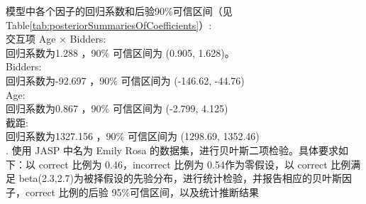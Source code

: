 \documentclass[stu,12pt,floatsintext]{apa7} %
\begin{document}

\begin{table}[H]
	\centering
	\caption{根据后验分布的系数估计}
	\label{tab:posteriorSummariesOfCoefficients}
\end{table}

模型中各个因子的回归系数和后验90\%可信区间（见Table\ref{tab:posteriorSummariesOfCoefficients}）:\\
交互项 Age × Bidders:\\
回归系数为1.288 ，90\% 可信区间为 (0.905, 1.628)。\\
Bidders:\\
回归系数为-92.697  ，90\% 可信区间为 (-146.62, -44.76)\\
Age:\\
回归系数为0.867  ，90\% 可信区间为 (-2.799, 4.125)\\
截距:\\
回归系数为1327.156 ，90\% 可信区间为 (1298.69, 1352.46)\\


\vspace{1em}
. {\heiti 使用 JASP 中名为 Emily Rosa 的数据集，进行贝叶斯二项检验。具体要求如下：以 correct 比例为 0.46，incorrect 比例为 0.54作为零假设，以 correct 比例满足 beta(2.3,2.7)为被择假设的先验分布，进行统计检验，并报告相应的贝叶斯因子，correct 比例的后验 95\%可信区间，以及统计推断结果}
\end{document}
